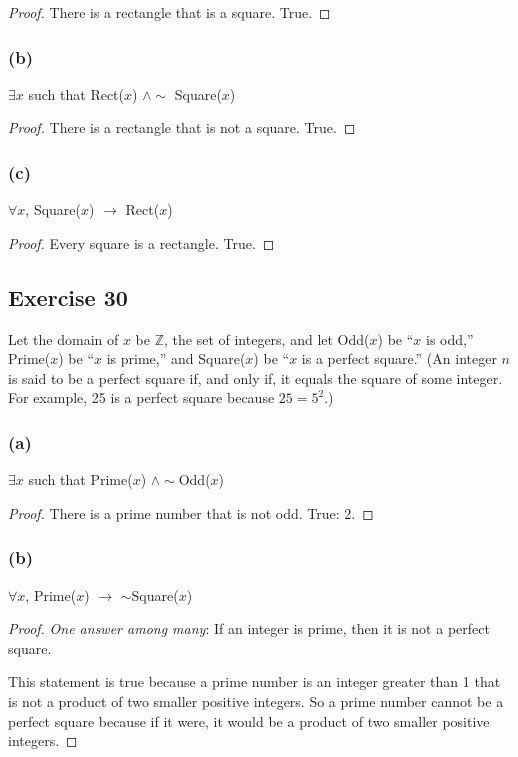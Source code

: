 \documentclass[14pt]{extarticle}
\newcommand{\Z}{\mathbb{Z}}
\newcommand{\fa}{\forall}
\newcommand{\te}{\exists}
\begin{document}
\begin{proof}
There is a rectangle that is a square. True.
\end{proof}

\subsubsection{(b)}
$\te x$ such that Rect($x$) $\wedge \sim$ Square($x$)

\begin{proof}
There is a rectangle that is not a square. True.
\end{proof}

\subsubsection{(c)}
$\fa x$, Square($x$) $\to$ Rect($x$)

\begin{proof}
Every square is a rectangle. True.
\end{proof}

\subsection{Exercise 30}
Let the domain of $x$ be $\Z$, the set of integers, and let Odd($x$) be “$x$ is odd,” Prime($x$) be “$x$ is prime,” and Square($x$) be “$x$ is a perfect square.” (An integer $n$ is said to be a perfect square if, and only if, it equals the square of some integer. For example, 25 is a perfect square because $25 = 5^2$.)

\subsubsection{(a)}
$\te x$ such that Prime($x$) $\wedge\sim$Odd($x$)

\begin{proof}
There is a prime number that is not odd. True: 2.
\end{proof}

\subsubsection{(b)}
$\fa x$, Prime($x$) $\to$ $\sim$Square($x$)

\begin{proof}
{\it One answer among many}: If an integer is prime, then it is not a perfect square.

This statement is true because a prime number is an integer greater than 1 that is not a product of two smaller positive integers. So a prime number cannot be a perfect square because if it were, it would be a product of two smaller positive integers.
\end{proof}
\end{document}
